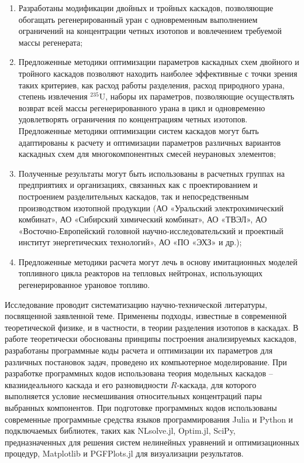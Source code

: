 {\influence} 
\begin{enumerate}
  \item Разработаны модификации двойных и тройных каскадов, позволяющие обогащать регенерированный уран с одновременным выполнением ограничений на концентрации четных изотопов и вовлечением требуемой массы регенерата;
  \item Предложенные методики оптимизации параметров каскадных схем двойного и тройного каскадов позволяют находить наиболее эффективные с точки зрения таких критериев, как расход работы разделения, расход природного урана, степень извлечения $^{235}$U, наборы их параметров, позволяющие осуществлять возврат всей массы регенерированного урана в цикл и одновременно удовлетворять ограничения по концентрациям четных изотопов. Предложенные методики оптимизации систем каскадов могут быть адаптированы к расчету и оптимизации параметров различных вариантов каскадных схем для многокомпонентных смесей неурановых элементов;
  \item Полученные результаты могут быть использованы в расчетных группах на предприятиях и организациях, связанных как с проектированием и построением разделительных каскадов, так и непосредственным производством изотопной продукции (АО «Уральский электрохимический комбинат», АО «Сибирский химический комбинат», АО «ТВЭЛ», АО «Восточно-Европейский головной научно-исследовательский и проектный институт энергетических технологий», АО «ПО «ЭХЗ» и др.); 
  \item Предложенные методики расчета могут лечь в основу имитационных моделей топливного цикла реакторов на тепловых нейтронах, использующих регенерированное урановое топливо.  
\end{enumerate}


{\methods}
Исследование проводит систематизацию научно-технической литературы, посвященной заявленной теме.
Применены подходы, известные в современной теоретической физике, и в частности, в теории разделения изотопов в каскадах.
В работе теоретически обоснованы принципы построения анализируемых каскадов, разработаны программные коды расчета и оптимизации их параметров для различных постановок задач, проведено их компьютерное моделирование.
При разработке программных кодов использована теория модельных каскадов -- квазиидеального каскада и его разновидности $R$-каскада, для которого выполняется условие несмешивания относительных концентраций пары выбранных компонентов. При подготовке программных кодов использованы современные программные средства языков программирования Julia и Python и подключаемых библиотек, таких как NLsolve.jl, Optim.jl, SciPy, предназначенных для решения систем нелинейных уравнений и оптимизационных процедур, Matplotlib и PGFPlots.jl для визуализации результатов.


